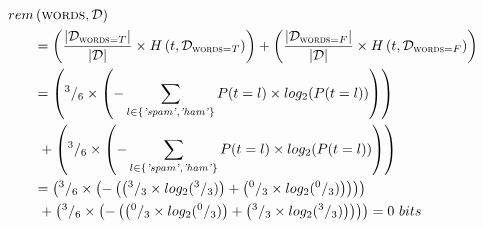 \documentclass[xcolor={table}]{beamer}
\newcommand{\featN}[1]{\textsc{#1}}
\newcommand{\featL}[1]{\textit{'#1'}}
\begin{document}
 \begin{frame} 
\begin{footnotesize}
\begin{equation*}
\begin{alignedat}{2}
rem&\left(\text{\featN{words}},\mathcal{D}\right)\\
&= \left(\frac{|\mathcal{D}_{\text{\featN{words}}=T}|}{|\mathcal{D}|} \times H\left(t,\mathcal{D}_{\text{\featN{words}}=T}\right) \right) + \left(\frac{|\mathcal{D}_{\text{\featN{words}}=F}|}{|\mathcal{D}|} \times H\left(t,\mathcal{D}_{\text{\featN{words}}=F}\right) \right) \\
&= \left(^3/_6 \times \left(-\sum_{l \in \{\text{\featL{spam}},\text{\featL{ham}}\}} P(t=l) \times log_2(P(t=l))\right) \right) \\
&~+ \left( ^3/_6 \times \left(-\sum_{l \in \{\text{\featL{spam}},\text{\featL{ham}}\}} P(t=l) \times log_2(P(t=l)) \right)\right)\\
&=
\left(
^3/_6 \times
\left( - \left(
\left( ^3/_3 \times log_2( ^3/_3) \right)
+
\left( ^0/_3 \times log_2( ^0/_3) \right)
\right)
\right)
\right)
\\
&~+
\left( ^3/_6 \times
\left( - \left(
\left( ^0/_3 \times log_2( ^0/_3) \right)
+
\left( ^3/_3 \times log_2( ^3/_3) \right)
\right)
\right)
\right) = 0~bits
\end{alignedat}
\label{eq:remaindersw}
\end{equation*}
\end{footnotesize}
\end{frame} 
\end{document}
